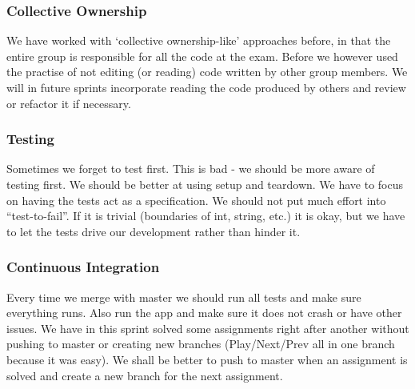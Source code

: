 \subsubsection{Collective Ownership}
We have worked with ‘collective ownership-like’ approaches before, in that the entire group is responsible for all the code at the exam.
Before we however used the practise of not editing (or reading) code written by other group members.
We will in future sprints incorporate reading the code produced by others and review or refactor it if necessary.

\subsubsection{Testing}
Sometimes we forget to test first. This is bad - we should be more aware of testing first.
We should be better at using setup and teardown.
We have to focus on having the tests act as a specification. We should not put much effort into “test-to-fail”. If it is trivial (boundaries of int, string, etc.) it is okay, but we have to let the tests drive our development rather than hinder it.

\subsubsection{Continuous Integration}
Every time we merge with master we should run all tests and make sure everything runs. Also run the app and make sure it does not crash or have other issues.
We have in this sprint solved some assignments right after another without pushing to master or creating new branches (Play/Next/Prev all in one branch because it was easy). We shall be better to push to master when an assignment is solved and create a new branch for the next assignment.
